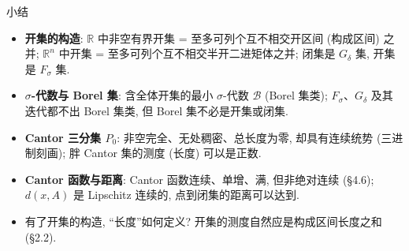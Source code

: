 \begin{frame}{小结}

\begin{itemize}
\item \textbf{开集的构造}: $\mathbb{R}$ 中非空有界开集 = 至多可列个互不相交开区间 (构成区间) 之并;
$\mathbb{R}^n$ 中开集 = 至多可列个互不相交半开二进矩体之并; 闭集是 $G_\delta$ 集, 开集是 $F_\sigma$ 集.
\item \textbf{$\sigma$-代数与 Borel 集}: 含全体开集的最小 $\sigma$-代数 $\mathscr{B}$ (Borel 集类);
$F_\sigma$、$G_\delta$ 及其迭代都不出 Borel 集类, 但 Borel 集不必是开集或闭集.
\item \textbf{Cantor 三分集 $P_0$}: 非空完全、无处稠密、总长度为零, 却具有连续统势 (三进制刻画);
胖 Cantor 集的测度 (长度) 可以是正数.
\item \textbf{Cantor 函数与距离}: Cantor 函数连续、单增、满, 但非绝对连续 (§4.6);
$d(x, A)$ 是 Lipschitz 连续的, 点到闭集的距离可以达到.
\end{itemize}

\pause

\begin{question}
\begin{itemize}
\item 有了开集的构造, ``长度''如何定义? 开集的测度自然应是构成区间长度之和 (§2.2).
\end{itemize}
\end{question}

\end{frame}


